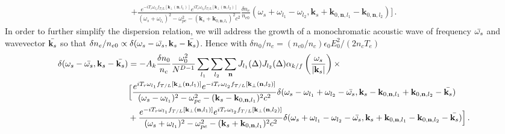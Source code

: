 \documentclass[
 reprint,
 amsmath,amssymb,
 aps,
]{revtex4-1}
\begin{document}
\begin{widetext}
\begin{align}
   + \frac{   e^{-iT_{r} \omega_{l_1}f_{T/L}[\mathbf{k}_\perp(\mathbf{n},l_1)]  }
  e^{iT_{r}  \omega_{l_2}f_{T/L}[\mathbf{k}_\perp(\mathbf{n},l_2)]  }
   }{(\omega_s+\omega_{l_1})^2 - \omega_{pe}^2 -(\mathbf{k}_s+ \mathbf{k}_{0,\mathbf{n},l_1})^2c^2} 
   \frac{\delta n_e }{n_{e0}}(\omega_s+\omega_{l_1}-\omega_{l_2},\mathbf{k}_s+\mathbf{k}_{0,\mathbf{n},l_1}-\mathbf{k}_{0,\mathbf{n},l_2}) 
   \Big]
   \, .\label{eq:fssd3}
\end{align}
In order to further simplify the dispersion relation, we will address the growth of a monochromatic acoustic wave  of frequency $\Bar{\omega_s}$ and wavevector $\Bar{\mathbf{k}_s}$ so that $\delta n_e/n_{e0}\propto \delta(\omega_s-\Bar{\omega_s}, {\mathbf{k}_s}-\Bar{\mathbf{k}_s})$. Hence    with $\delta n_0/n_{c} =(n_{e0}/n_c)\epsilon_0 E_0^2/ (2n_c T_e ) $
\begin{align}
   \delta(\omega_s-\Bar{\omega_s}, {\mathbf{k}_s}-\Bar{\mathbf{k}_s})
   &= -A_k \frac{\delta n_0}{n_c}\frac{\omega_0^2}{N^{D-1}}  \sum_{l_1}  \sum_{l_2} \sum_{\mathbf{n}}    J_{l_1}(\Delta)J_{l_2}(\Delta)\alpha_{k/f}\left(\frac{\omega_s}{\vert\mathbf{k}_s \vert} \right) \times \nonumber \\
  & \Big[  
     \frac{  e^{iT_{r} \omega_{l_1}f_{T/L}[\mathbf{k}_\perp(\mathbf{n},l_1)]  }
  e^{-iT_{r}  \omega_{l_2}f_{T/L}[\mathbf{k}_\perp(\mathbf{n},l_2)]  }
     }{(\omega_s-\omega_{l_1})^2 - \omega_{pe}^2 -(\mathbf{k}_s- \mathbf{k}_{0,\mathbf{n},l_1})^2c^2}
     \delta(\omega_s-\omega_{l_1}+\omega_{l_2}-\Bar{\omega_s}, \mathbf{k}_s-\mathbf{k}_{0,\mathbf{n},l_1}+\mathbf{k}_{0,\mathbf{n},l_2}-\Bar{\mathbf{k}_s}) \nonumber\\&
   + \frac{   e^{-iT_{r} \omega_{l_1}f_{T/L}[\mathbf{k}_\perp(\mathbf{n},l_1)]  }
  e^{iT_{r}  \omega_{l_2}f_{T/L}[\mathbf{k}_\perp(\mathbf{n},l_2)]  }
   }{(\omega_s+\omega_{l_1})^2 - \omega_{pe}^2 -(\mathbf{k}_s+ \mathbf{k}_{0,\mathbf{n},l_1})^2c^2} 
    \delta(\omega_s+\omega_{l_1}-\omega_{l_2}-\Bar{\omega_s}, \mathbf{k}_s+\mathbf{k}_{0,\mathbf{n},l_1}-\mathbf{k}_{0,\mathbf{n},l_2}-\Bar{\mathbf{k}_s}) 
   \Big]
   \, .\label{eq:fssd3}
\end{align}


\end{widetext}
\end{document}
